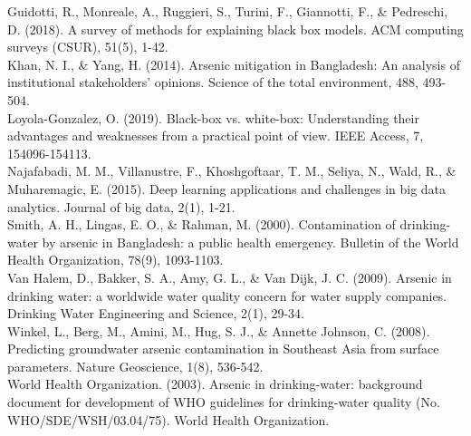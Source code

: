 Guidotti, R., Monreale, A., Ruggieri, S., Turini, F., Giannotti, F., \& Pedreschi, D. (2018). A survey of methods for explaining black box models. ACM computing surveys (CSUR), 51(5), 1-42.\\

Khan, N. I., \& Yang, H. (2014). Arsenic mitigation in Bangladesh: An analysis of institutional stakeholders' opinions. Science of the total environment, 488, 493-504.\\

Loyola-Gonzalez, O. (2019). Black-box vs. white-box: Understanding their advantages and weaknesses from a practical point of view. IEEE Access, 7, 154096-154113.\\

Najafabadi, M. M., Villanustre, F., Khoshgoftaar, T. M., Seliya, N., Wald, R., \& Muharemagic, E. (2015). Deep learning applications and challenges in big data analytics. Journal of big data, 2(1), 1-21.\\

Smith, A. H., Lingas, E. O., \& Rahman, M. (2000). Contamination of drinking-water by arsenic in Bangladesh: a public health emergency. Bulletin of the World Health Organization, 78(9), 1093-1103.\\

Van Halem, D., Bakker, S. A., Amy, G. L., \& Van Dijk, J. C. (2009). Arsenic in drinking water: a worldwide water quality concern for water supply companies. Drinking Water Engineering and Science, 2(1), 29-34.\\

Winkel, L., Berg, M., Amini, M., Hug, S. J., \& Annette Johnson, C. (2008). Predicting groundwater arsenic contamination in Southeast Asia from surface parameters. Nature Geoscience, 1(8), 536-542.\\

World Health Organization. (2003). Arsenic in drinking-water: background document for development of WHO guidelines for drinking-water quality (No. WHO/SDE/WSH/03.04/75). World Health Organization.\\